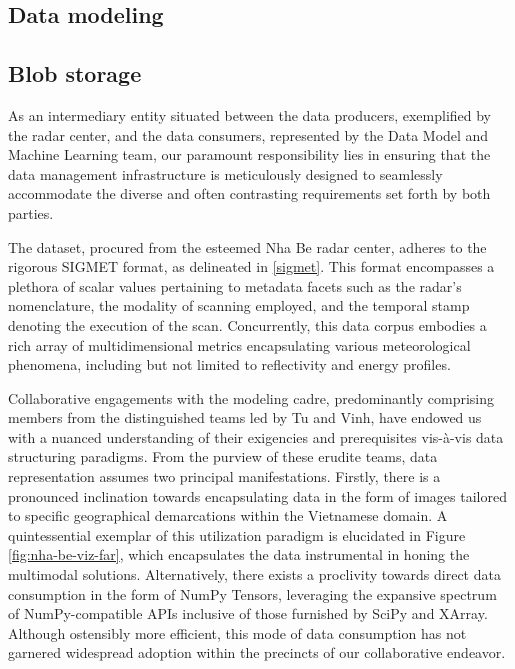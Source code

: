 
\subsection{Data modeling}

\subsection{Blob storage}
As an intermediary entity situated between the data producers, exemplified by
the radar center, and the data consumers, represented by the Data Model and
Machine Learning team, our paramount responsibility lies in ensuring that the
data management infrastructure is meticulously designed to seamlessly
accommodate the diverse and often contrasting requirements set forth by both
parties.

The dataset, procured from the esteemed Nha Be radar center, adheres to the
rigorous SIGMET format, as delineated in \ref{sigmet}. This format encompasses a
plethora of scalar values pertaining to metadata facets such as the radar's
nomenclature, the modality of scanning employed, and the temporal stamp denoting
the execution of the scan. Concurrently, this data corpus embodies a rich array
of multidimensional metrics encapsulating various meteorological phenomena,
including but not limited to reflectivity and energy profiles.

Collaborative engagements with the modeling cadre, predominantly comprising
members from the distinguished teams led by Tu and Vinh, have endowed us with a
nuanced understanding of their exigencies and prerequisites vis-à-vis data
structuring paradigms. From the purview of these erudite teams, data
representation assumes two principal manifestations. Firstly, there is a
pronounced inclination towards encapsulating data in the form of images tailored
to specific geographical demarcations within the Vietnamese domain. A
quintessential exemplar of this utilization paradigm is elucidated in Figure
\ref{fig:nha-be-viz-far}, which encapsulates the data instrumental in honing the
multimodal solutions. Alternatively, there exists a proclivity towards direct
data consumption in the form of NumPy Tensors, leveraging the expansive spectrum
of NumPy-compatible APIs inclusive of those furnished by SciPy and XArray.
Although ostensibly more efficient, this mode of data consumption has not
garnered widespread adoption within the precincts of our collaborative endeavor.

